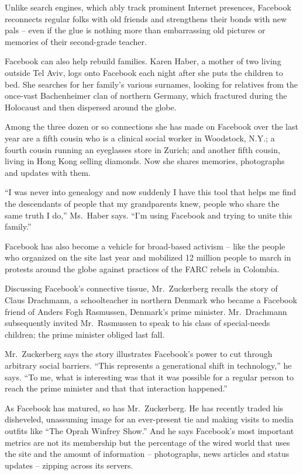 \documentclass[12pt,a4paper,onecolumn]{article}
\begin{document}
Unlike search engines, which ably track prominent Internet presences, Facebook reconnects regular
folks with old friends and strengthens their bonds with new pals -- even if the glue is nothing more
than embarrassing old pictures or memories of their second-grade teacher.

Facebook can also help rebuild families. Karen Haber, a mother of two living outside Tel Aviv, logs
onto Facebook each night after she puts the children to bed. She searches for her family's various
surnames, looking for relatives from the once-vast Bachenheimer clan of northern Germany, which
fractured during the Holocaust and then dispersed around the globe.

Among the three dozen or so connections she has made on Facebook over the last year are a fifth
cousin who is a clinical social worker in Woodstock, N.Y.; a fourth cousin running an eyeglasses
store in Zurich; and another fifth cousin, living in Hong Kong selling diamonds. Now she shares
memories, photographs and updates with them.

``I was never into genealogy and now suddenly I have this tool that helps me find the descendants of
people that my grandparents knew, people who share the same truth I do,'' Ms.~Haber says. ``I'm
using Facebook and trying to unite this family.''

Facebook has also become a vehicle for broad-based activism -- like the people who organized on the
site last year and mobilized 12 million people to march in protests around the globe against
practices of the FARC rebels in Colombia.

Discussing Facebook's connective tissue, Mr.~Zuckerberg recalls the story of Claus Drachmann, a
schoolteacher in northern Denmark who became a Facebook friend of Anders Fogh Rasmussen, Denmark's
prime minister. Mr.~Drachmann subsequently invited Mr.~Rasmussen to speak to his class of
special-needs children; the prime minister obliged last fall.

Mr.~Zuckerberg says the story illustrates Facebook's power to cut through arbitrary social barriers.
``This represents a generational shift in technology,'' he says. ``To me, what is interesting was
that it was possible for a regular person to reach the prime minister and that that interaction
happened.''

As Facebook has matured, so has Mr.~Zuckerberg. He has recently traded his disheveled, unassuming
image for an ever-present tie and making visits to media outfits like ``The Oprah Winfrey Show.''
And he says Facebook's most important metrics are not its membership but the percentage of the wired
world that uses the site and the amount of information -- photographs, news articles and status
updates -- zipping across its servers.
\end{document}
